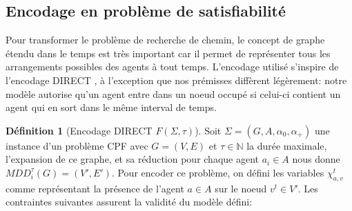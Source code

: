 \documentclass[french, 12pt, letterpaper]{article}
\theoremstyle{definition}
\newtheorem{definition}{Définition}[subsection]
\theoremstyle{proposition}
\theoremstyle{example}
\begin{document}
    

    \subsection{Encodage en problème de satisfiabilité}
    \label{sec:encoding}

    Pour transformer le problème de recherche de chemin, le concept de graphe étendu dans le temps est très important car
    il permet de représenter tous les arrangements possibles des agents à tout temps.
    L'encodage utilisé s'inspire de l'encodage DIRECT \cite{PSURDIRECT}, à l'exception que nos prémisses diffèrent légèrement:
    notre modèle autorise qu'un agent entre dans un noeud occupé si celui-ci contient un agent qui en sort dans le même interval de temps.

    \begin{definition}[Encodage DIRECT $F(\Sigma, \tau)$]
        \label{def:encoding}
        Soit $\Sigma=( G, A, \alpha_0, \alpha_+)$ une instance d'un problème CPF avec $G = ( V, E )$ et $\tau\in \mathbb{N}$
        la durée maximale, l'expansion de ce graphe, et sa réduction pour chaque agent $a_i \in A$ nous donne $MDD^\tau_i(G) = ( V', E' )$.
        Pour encoder ce problème, on défini les variables $\chi_{a, v}^t$ comme représentant la présence de l'agent $a\in A$ sur le noeud $v^t \in V'$.
        Les contraintes suivantes assurent la validité du modèle défini:
        

\end{definition}
\end{document}
